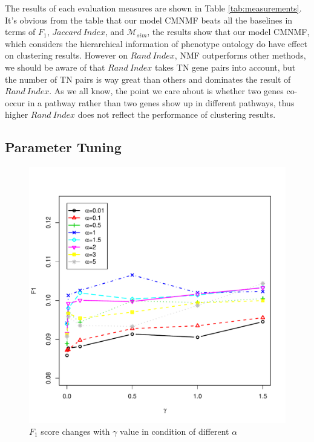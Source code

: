 \documentclass{bmcart}
\begin{document}
The results of each evaluation measures are shown in Table \ref{tab:measurements}.
It's obvious from the table that our model CMNMF beats all the baselines in terms of $F_1$, $Jaccard\ Index$, and $\mathcal{M}_{sim}$, the results show that our model CMNMF, which considers the hierarchical information of phenotype ontology do have effect on clustering results. However on $Rand\ Index$, NMF outperforms other methods, we should be aware of that $Rand\ Index$ takes TN gene pairs into account, but the number of TN pairs is way great than others and dominates the result of $Rand\ Index$. As we all know, the point we care about is whether two genes co-occur in a pathway rather than two genes show up in different pathways, thus higher $Rand\ Index$ does not reflect the performance of clustering results.

\subsection*{\textbf{Parameter Tuning}}
\begin{figure}[!h]
  \begin{minipage}[t]{0.7\linewidth}
    \includegraphics[width=\linewidth,origin = l]{DrawPictures/alpha-gamma.pdf}
  \end{minipage}
  \caption{$F_1$ score changes with $\gamma$ value in condition of different $\alpha$}
  \label{fig:alpha_gamma}
\end{figure}
\end{document}

